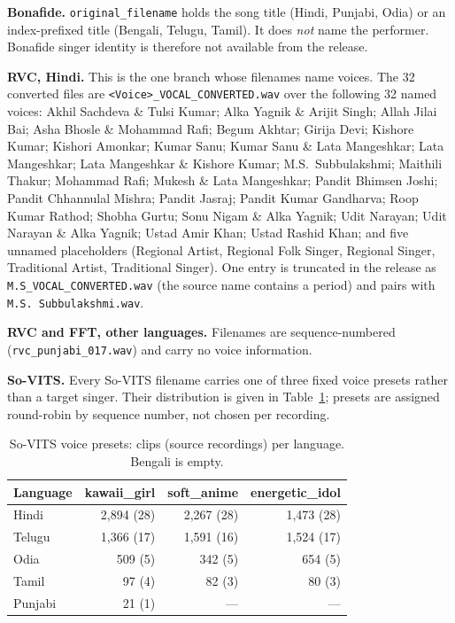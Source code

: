 \documentclass[conference]{IEEEtran}
\begin{document}
\noindent\textbf{Bonafide.} \texttt{original\_filename} holds the song title (Hindi,
Punjabi, Odia) or an index-prefixed title (Bengali, Telugu, Tamil). It does \emph{not}
name the performer. Bonafide singer identity is therefore not available from the release.

\noindent\textbf{RVC, Hindi.} This is the one branch whose filenames name voices. The 32
converted files are \texttt{<Voice>\_VOCAL\_CONVERTED.wav} over the following 32 named
voices: Akhil Sachdeva \& Tulsi Kumar; Alka Yagnik \& Arijit Singh; Allah Jilai Bai; Asha
Bhosle \& Mohammad Rafi; Begum Akhtar; Girija Devi; Kishore Kumar; Kishori Amonkar; Kumar
Sanu; Kumar Sanu \& Lata Mangeshkar; Lata Mangeshkar; Lata Mangeshkar \& Kishore Kumar;
M.S.\ Subbulakshmi; Maithili Thakur; Mohammad Rafi; Mukesh \& Lata Mangeshkar; Pandit
Bhimsen Joshi; Pandit Chhannulal Mishra; Pandit Jasraj; Pandit Kumar Gandharva; Roop Kumar
Rathod; Shobha Gurtu; Sonu Nigam \& Alka Yagnik; Udit Narayan; Udit Narayan \& Alka
Yagnik; Ustad Amir Khan; Ustad Rashid Khan; and five unnamed placeholders (Regional
Artist, Regional Folk Singer, Regional Singer, Traditional Artist, Traditional Singer).
One entry is truncated in the release as \texttt{M.S\_VOCAL\_CONVERTED.wav} (the source
name contains a period) and pairs with \texttt{M.S.~Subbulakshmi.wav}.

\noindent\textbf{RVC and FFT, other languages.} Filenames are sequence-numbered
(\texttt{rvc\_punjabi\_017.wav}) and carry no voice information.

\noindent\textbf{So-VITS.} Every So-VITS filename carries one of three fixed voice
presets rather than a target singer. Their distribution is given in
Table~\ref{tab:s4}; presets are assigned round-robin by sequence number, not chosen per
recording.

\begin{table}[t]
\centering
\caption{So-VITS voice presets: clips (source recordings) per language. Bengali is empty.}
\label{tab:s4}
\footnotesize
\begin{tabular}{lrrr}
\toprule
\textbf{Language} & \textbf{kawaii\_girl} & \textbf{soft\_anime} & \textbf{energetic\_idol} \\
\midrule
Hindi   & 2{,}894 (28) & 2{,}267 (28) & 1{,}473 (28) \\
Telugu  & 1{,}366 (17) & 1{,}591 (16) & 1{,}524 (17) \\
Odia    &   509 (5)  &   342 (5)  &   654 (5)  \\
Tamil   &    97 (4)  &    82 (3)  &    80 (3)  \\
Punjabi &    21 (1)  &     ---    &     ---    \\
\bottomrule
\end{tabular}
\end{table}
\end{document}
